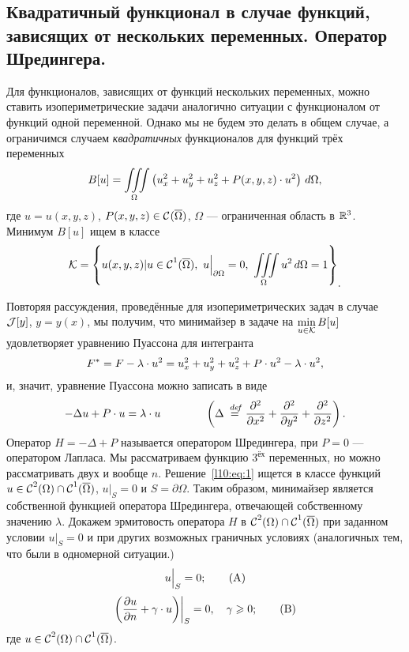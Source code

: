 	\chapter{}
\label{lecture10}
\section[Квадратичный функционал. Оператор Шредингера.]{Квадратичный функционал в случае функций, зависящих от нескольких переменных. Оператор Шредингера.}
\label{lecture10section1}
Для функционалов, зависящих от функций нескольких переменных, можно ставить изопериметрические задачи аналогично ситуации с функционалом от функций одной переменной. Однако мы не будем это делать в общем случае, а ограничимся случаем \emph{квадратичных} функционалов для функций трёх переменных
\begin{equation}\label{l10:eq:0}
	\hfill B[u]=\iiint\limits_{\Omega}\left(u_x^2+u_y^2+u_z^2+P(x,y,z)\cdot u^2\right)\,d\Omega,\hfill
\end{equation}
где $u=u(x,y,z)$, $P(x,y,z)\in\mathcal{C}{\mathstrut}^{}_{}(\overline{\Omega})$, $\Omega$ --- ограниченная область в $\mathbb{R}^3$. Минимум $B[u]$ ищем в классе
\begin{equation*}
	\hfill\K=\left\{u(x,y,z)|u\in\Cfn{1}(\overline{\Omega}),\ u\Big|_{\partial\Omega}=0,\ \iiint\limits_{\Omega}u^2\,d\Omega=1\right\}_{\displaystyle.}\hfill
\end{equation*}

Повторяя рассуждения, проведённые для изопериметрических задач в случае $\mathcal{J}[y]$, $y=y(x)$, мы получим, что минимайзер в задаче на $\displaystyle\min\limits_{u\in\mathcal{K}}B[u]$ удовлетворяет уравнению Пуассона для интегранта
\begin{equation*}
	\hfill F^{\ast}=F-\lambda\cdot u^2=u_x^2+u_y^2+u_z^2+P\cdot u^2-\lambda\cdot u^2,\hfill
\end{equation*}
и, значит,  уравнение Пуассона можно записать в виде
\begin{equation}\label{l10:eq:1}
	\hfill-\Delta u+P\cdot u=\lambda\cdot u\qquad\qquad\left(\Delta\eqdef\pdder{}{x}+\pdder{}{y}+\pdder{}{z}\right).\hfill
\end{equation}
Оператор $H=-\Delta+P$ называется оператором Шредингера, при $P=0$ --- оператором Лапласа. Мы рассматриваем функцию $3^{\text{ёх}}$ переменных, но можно рассматривать двух и вообще $n$. Решение~\eqref{l10:eq:1} ищется в классе функций $u\in\mathcal{C}{\mathstrut}^{2}_{}(\Omega)\cap\mathcal{C}{\mathstrut}^{1}_{}(\overline{\Omega})$, $u\Big|_{S}=0$ и $S=\partial\Omega$. Таким образом, минимайзер является собственной функцией оператора Шредингера, отвечающей собственному значению $\lambda$. Докажем эрмитовость оператора $H$ в $\mathcal{C}{\mathstrut}^{2}_{}(\Omega)\cap\mathcal{C}{\mathstrut}^{1}_{}(\overline{\Omega})$ при заданном условии $u\Big|_{S}=0$ и при других возможных граничных условиях (аналогичных тем, что были в одномерной ситуации.)
\begin{equation}\label{l10:eq:A}
	\hfill u\Big|_{S}=0;\tag{A}\hfill
\end{equation}
\begin{equation}\label{l10:eq:B}
	\hfill \left(\pder{u}{n}+\gamma\cdot u\middle)\right|_{S}=0,\quad\gamma\geqslant0;\tag{B}\hfill
\end{equation}
где $u\in\mathcal{C}{\mathstrut}^{2}_{}(\Omega)\cap\mathcal{C}{\mathstrut}^{1}_{}(\overline{\Omega})$.

